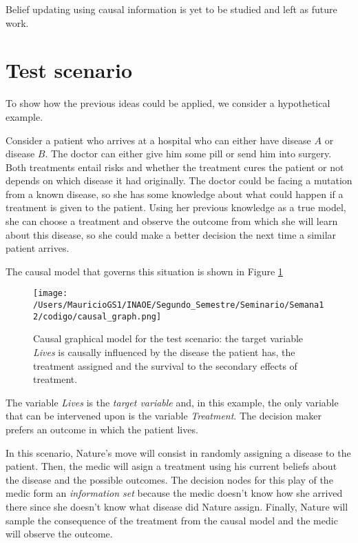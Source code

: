 \documentclass{article}
\begin{document}
Belief updating using causal information is yet to be studied and left as future work. 

\section{Test scenario}
To show how the previous ideas could be applied, we consider a hypothetical example.

Consider a patient who arrives at a hospital who can either have disease $A$ or disease $B$. The doctor can either give him some pill or send him into surgery.  Both treatments entail risks and whether the treatment cures the patient or not depends on which disease it had originally. The doctor could be facing a mutation from a known disease, so she has some knowledge about what could happen if a treatment is given to the patient. Using her previous knowledge as a true model, she can choose a treatment and observe the outcome from which she will learn about this disease, so she could make a better decision the next time a similar patient arrives.

The causal model that governs this situation is shown in Figure \ref{causal_model}

\begin{figure}[ht]
\vskip 0.2in
\begin{center}
\centerline{\texttt{[image: /Users/MauricioGS1/INAOE/Segundo\_Semestre/Seminario/Semana12/codigo/causal\_graph.png]}}
\caption{Causal graphical model for the test scenario: the target variable \textit{Lives} is causally influenced by the disease the patient has, the treatment assigned and the survival to the secondary effects of treatment.}
\label{causal_model}
\end{center}
\vskip -0.2in
\end{figure}

The variable \textit{Lives} is the \textit{target variable} and, in this example, the only variable that can be intervened upon is the variable \textit{Treatment}. The decision maker prefers an outcome in which the patient lives.

In this scenario, Nature's move will consist in randomly assigning a disease to the patient. Then, the medic will asign a treatment using his current beliefs about the disease and the possible outcomes. The decision nodes for this play of the medic form an \textit{information set} because the medic doesn't know how she arrived there since she doesn't know what disease did Nature assign. Finally, Nature will sample the consequence of the treatment from the causal model and the medic will observe the outcome.
\end{document}
